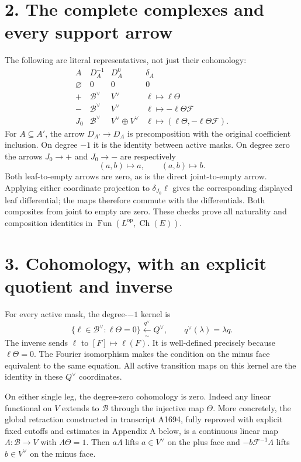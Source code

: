 \section{2. The complete complexes and every support
arrow}\label{the-complete-complexes-and-every-support-arrow}

The following are literal representatives, not just their cohomology: \[
\begin{array}{c|c|c|c}
A&D_A^{-1}&D_A^0&\delta_A\\ \hline
\varnothing&0&0&0\\
+&\mathscr B^\vee&V^\vee&\ell\mapsto\ell\Theta\\
-&\mathscr B^\vee&V^\vee&\ell\mapsto-\ell\Theta\mathcal F\\
J_0&\mathscr B^\vee&V^\vee\oplus V^\vee&
\ell\mapsto(\ell\Theta,-\ell\Theta\mathcal F).
\end{array}
\] For \(A\subseteq A'\), the arrow \(D_{A'}\to D_A\) is precomposition
with the original coefficient inclusion. On degree \(-1\) it is the
identity between active masks. On degree zero the arrows \(J_0\to+\) and
\(J_0\to-\) are respectively \[
(a,b)\mapsto a,\qquad(a,b)\mapsto b.
\] Both leaf-to-empty arrows are zero, as is the direct joint-to-empty
arrow. Applying either coordinate projection to \(\delta_{J_0}\ell\)
gives the corresponding displayed leaf differential; the maps therefore
commute with the differentials. Both composites from joint to empty are
zero. These checks prove all naturality and composition identities in
\(\operatorname{Fun}(L^{\mathrm{op}},\operatorname{Ch}(E))\).

\section{3. Cohomology, with an explicit quotient and
inverse}\label{cohomology-with-an-explicit-quotient-and-inverse}

For every active mask, the degree-\(-1\) kernel is \[
\{\ell\in\mathscr B^\vee:\ell\Theta=0\}
\xleftarrow[\sim]{q^\vee}Q^\vee,
\qquad q^\vee(\lambda)=\lambda q.
\] The inverse sends \(\ell\) to \([F]\mapsto\ell(F)\). It is
well-defined precisely because \(\ell\Theta=0\). The Fourier isomorphism
makes the condition on the minus face equivalent to the same equation.
All active transition maps on this kernel are the identity in these
\(Q^\vee\) coordinates.

On either single leg, the degree-zero cohomology is zero. Indeed any
linear functional on \(V\) extends to \(\mathscr B\) through the
injective map \(\Theta\). More concretely, the global retraction
constructed in transcript A1694, fully reproved with explicit fixed
cutoffs and estimates in Appendix A below, is a continuous linear map
\(\Lambda:\mathscr B\to V\) with \(\Lambda\Theta=1\). Then \(a\Lambda\)
lifts \(a\in V^\vee\) on the plus face and \(-b\mathcal F^{-1}\Lambda\)
lifts \(b\in V^\vee\) on the minus face.

